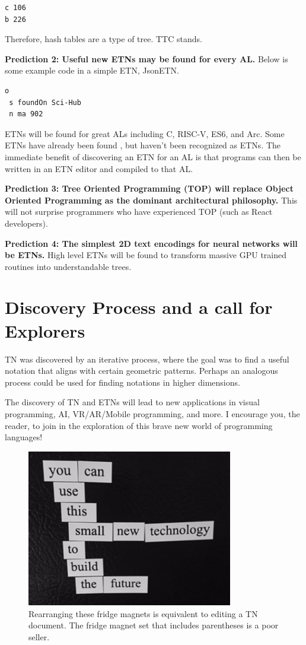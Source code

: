 \documentclass[journal]{IEEEtran}
\begin{document}
\begin{lstlisting}
c 106
b 226
\end{lstlisting}

Therefore, hash tables are a type of tree. TTC stands.

\textbf{Prediction 2: Useful new ETNs may be found for every AL.} Below is some example code in a simple ETN, JsonETN.

\begin{lstlisting}
o
 s foundOn Sci-Hub
 n ma 902
\end{lstlisting}

ETNs will be found for great ALs including C, RISC-V, ES6, and Arc. Some ETNs have already been found \cite{Roughan}, but haven't been recognized as ETNs. The immediate benefit of discovering an ETN for an AL is that programs can then be written in an ETN editor and compiled to that AL.

\textbf{Prediction 3: Tree Oriented Programming (TOP) will replace Object Oriented Programming as the dominant architectural philosophy.} This will not surprise programmers who have experienced TOP (such as React developers).

\textbf{Prediction 4: The simplest 2D text encodings for neural networks will be ETNs.} High level ETNs will be found to transform massive GPU trained routines into understandable trees.

\section{Discovery Process and a call for Explorers}

TN was discovered by an iterative process, where the goal was to find a useful notation that aligns with certain geometric patterns. Perhaps an analogous process could be used for finding notations in higher dimensions.

The discovery of TN and ETNs will lead to new applications in visual programming, AI, VR/AR/Mobile programming, and more. I encourage you, the reader, to join in the exploration of this brave new world of programming languages!

\begin{figure}[ht!]
\centering
\includegraphics[width=90mm]{tree.jpg}
\caption{Rearranging these fridge magnets is equivalent to editing a TN document. The fridge magnet set that includes parentheses is a poor seller.}
\end{figure}
\end{document}
